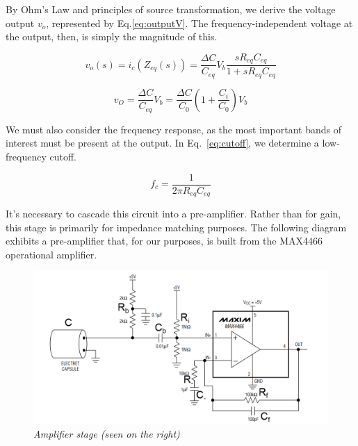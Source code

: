 \documentclass[journal]{IEEEtran}
\begin{document}
By Ohm's Law and principles of source transformation, we derive the voltage output $v_o$, represented by Eq.\ref{eq:outputV}. The frequency-independent voltage at the output, then, is simply the magnitude of this.  

\begin{figure}[ht]

	\begin{equation}
		v_o(s) = i_c(Z_{eq}(s)) = \frac{\Delta C}{C_{eq}} V_b \frac{sR_{eq}C_{eq}}{1 + sR_{eq}C_{eq}}
		\label{eq:outputV}
	\end{equation}

	\begin{equation}
		v_O = \frac{\Delta C}{C_{eq}} V_b = \frac{\Delta C}{C_0} \left(1 + \frac{C_i}{C_0}\right ) V_b
		\label{eq:outputFI}
	\end{equation}

\end{figure}

We must also consider the frequency response, as the most important bands of interest must be present at the output. In Eq.~\ref{eq:cutoff}, we determine a low-frequency cutoff.

\begin{figure}[ht]

	\begin{equation}
		f_c = \frac{1}{2 \pi R_{eq}C_{eq}}
		\label{eq:cutoff}
	\end{equation}

\end{figure}

It's necessary to cascade this circuit into a pre-amplifier. Rather than for gain, this stage is primarily for impedance matching purposes. The following diagram exhibits a pre-amplifier that, for our purposes, is built from the MAX4466 operational amplifier. 

\begin{figure}[ht]
	\centering
	\includegraphics[scale=0.24]{Amplifier2.png}
	\caption{\em Amplifier stage (seen on the right)}
	\label{fig:Amplifier}
\end{figure}
\end{document}
